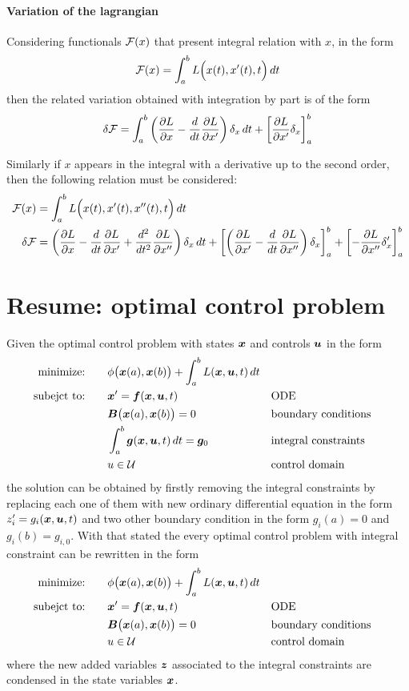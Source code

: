 	\paragraph{Variation of the lagrangian} Considering functionals $\mathcal F(x)$ that present integral relation with $x$, in the form
	\[ \mathcal{F}(x) = \int_a^b L\Big(x(t), x'(t), t\Big) \, dt \]
	then the related variation obtained with integration by part is of the form
	\[ \delta \mathcal{F} = \int_a^b \left( \frac{\partial L}{\partial x} - \frac d {dt} \frac{\partial L}{\partial x'} \right) \delta_x\, dt + \left[ \frac{\partial L}{\partial x'} \delta_x \right]_a^b \]
	
	Similarly if $x$ appears in the integral with a derivative up to the second order, then the following relation must be considered:
	\begin{align*}
		\mathcal{F}(x) & = \int_a^b L\Big(x(t), x'(t), x''(t), t \Big) \, dt \\
		\delta \mathcal{F} & = \left( \frac{\partial L}{\partial x} - \frac{d}{dt} \frac{\partial L}{\partial x'} + \frac{d^2}{dt^2} \frac{\partial L}{\partial x''} \right) \delta_x \, dt + \left[ \left( \frac{\partial L}{\partial x'} - \frac d{dt}\frac{\partial L}{\partial x''} \right) \delta_x \right]_a^b + \left[ -\frac{\partial L}{\partial x''} \delta_x' \right]_a^b
	\end{align*}
	

\newpage
\section{Resume: optimal control problem}
	Given the optimal control problem  with states $\boldsymbol{x}$ and controls $\boldsymbol{u}$ in the form
	\begin{align*}
		\textrm{minimize:} \qquad & \phi\big(\boldsymbol{x}(a), \boldsymbol{x}(b)\big) + \int_a^b L(\boldsymbol{x}, \boldsymbol{u}, t)\, dt \\
		\textrm{subejct to:} \qquad & \boldsymbol{x}' = \boldsymbol{f}(\boldsymbol{x}, \boldsymbol{u}, t) && \textrm{ODE}\\
		& \boldsymbol{B}\big(\boldsymbol{x}(a), \boldsymbol{x}(b)\big) = 0 && \textrm{boundary conditions}\\
		& \int_a^b \boldsymbol{g}(\boldsymbol{x},\boldsymbol{u}, t)\, dt = \boldsymbol{g}_0 && \textrm{integral constraints} \\
		& u \in \mathcal U && \textrm{control domain}
	\end{align*}
	the solution can be obtained by firstly removing the integral constraints by replacing each one of them with new ordinary differential equation in the form $z_i' = g_i(\boldsymbol{x},\boldsymbol{u}, t)$ and two other boundary condition in the form $g_i(a) = 0$ and $g_i(b) = g_{i,0}$. With that stated the every optimal control problem with integral constraint can be rewritten in the form
	\begin{align*}
		\textrm{minimize:} \qquad & \phi\big(\boldsymbol{x}(a), \boldsymbol{x}(b)\big) + \int_a^b L(\boldsymbol{x}, \boldsymbol{u}, t)\, dt \\
		\textrm{subejct to:} \qquad & \boldsymbol{x}' = \boldsymbol{f}(\boldsymbol{x}, \boldsymbol{u}, t) && \textrm{ODE}\\
		& \boldsymbol{B}\big(\boldsymbol{x}(a), \boldsymbol{x}(b)\big) = 0 && \textrm{boundary conditions} \\
		& u \in \mathcal U && \textrm{control domain}
	\end{align*}
	where the new added variables $\boldsymbol{z}$ associated to the integral constraints are condensed in the state variables $\boldsymbol{x}$.
	
